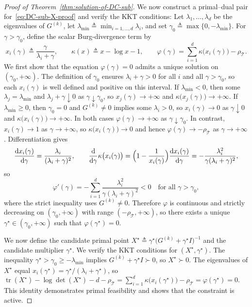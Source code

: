\documentclass[11pt, letterpaper, oneside, reqno]{amsart}
\DeclareMathOperator{\Tr}{tr}
\newcommand{\opt}{^\star}
\newcommand{\Let}{\triangleq}
\newcommand{\dd}{\mathrm{d}}
\begin{document}
\begin{proof}[Proof of Theorem~\ref{thm:solution-of-DC-sub}]
We now construct a primal--dual pair for~\eqref{eq:DC-sub-X-proof} and verify the KKT conditions:
Let $\lambda_1,\dots,\lambda_d$ be the eigenvalues of $G^{(k)}$, let $\lambda_{\min} \Let \min_{i=1,\dots,d}\lambda_i$, and set $\gamma_0 \Let \max\{0,-\lambda_{\min}\}$. For $\gamma>\gamma_0$, define the scalar Burg-divergence term by
\[
x_i(\gamma) \Let \frac{\gamma}{\lambda_i+\gamma},
\qquad
\kappa(x) \Let x-\log x-1,
\qquad
\varphi(\gamma) = \sum_{i=1}^d \kappa\bigl(x_i(\gamma)\bigr) - \rho_{\mathcal T}.
\]
We first show that the equation $\varphi(\gamma)=0$ admits a unique solution on $(\gamma_0,+\infty)$. The definition of $\gamma_0$ ensures $\lambda_i+\gamma>0$ for all $i$ and all $\gamma>\gamma_0$, so each $x_i(\gamma)$ is well defined and positive on this interval. If $\lambda_{\min}<0$, then some $\lambda_j=\lambda_{\min}$ and $\lambda_j+\gamma \downarrow 0$ as $\gamma \downarrow \gamma_0$, so $x_j(\gamma) \to +\infty$ and $\kappa\bigl(x_j(\gamma)\bigr)\to +\infty$. If $\lambda_{\min}\ge 0$, then $\gamma_0=0$ and $G^{(k)}\neq 0$ implies some $\lambda_i>0$, so $x_i(\gamma)\to 0$ as $\gamma\downarrow 0$ and $\kappa\bigl(x_i(\gamma)\bigr)\to +\infty$. In both cases $\varphi(\gamma)\to +\infty$ as $\gamma \downarrow \gamma_0$. In contrast, $x_i(\gamma)\to 1$ as $\gamma\to+\infty$, so $\kappa\bigl(x_i(\gamma)\bigr)\to 0$ and hence $\varphi(\gamma)\to -\rho_{\mathcal T}$ as $\gamma\to+\infty$. Differentiation gives
\[
\frac{\dd x_i(\gamma)}{\dd \gamma} = \frac{\lambda_i}{(\lambda_i+\gamma)^2},
\qquad
\frac{\dd}{\dd \gamma}\kappa\bigl(x_i(\gamma)\bigr)
= \Bigl(1-\frac{1}{x_i(\gamma)}\Bigr)\frac{\dd x_i(\gamma)}{\dd \gamma}
= -\frac{\lambda_i^2}{\gamma(\lambda_i+\gamma)^2},
\]
so
\[
\varphi'(\gamma)
= -\sum_{i=1}^d \frac{\lambda_i^2}{\gamma(\lambda_i+\gamma)^2}
<0
\quad \text{for all }\gamma>\gamma_0,
\]
where the strict inequality uses $G^{(k)}\neq 0$. Therefore $\varphi$ is continuous and strictly decreasing on $(\gamma_0,+\infty)$ with range $(-\rho_{\mathcal T},+\infty)$, so there exists a unique $\gamma\opt \in (\gamma_0,+\infty)$ such that $\varphi(\gamma\opt)=0$.

We now define the candidate primal point $X\opt \Let \gamma\opt\bigl(G^{(k)}+\gamma\opt I\bigr)^{-1}$ 
and the candidate multiplier $\gamma\opt$. We verify the KKT conditions for $(X\opt,\gamma\opt)$.
The inequality $\gamma\opt>\gamma_0 \ge -\lambda_{\min}$ implies $G^{(k)}+\gamma\opt I \succ 0$, so $X\opt \succ 0$. The eigenvalues of $X\opt$ equal $x_i(\gamma\opt)=\gamma\opt/(\lambda_i+\gamma\opt)$, so
$\Tr(X\opt) - \log\det(X\opt) - d - \rho_{\mathcal T}
= \sum_{i=1}^d \kappa\bigl(x_i(\gamma\opt)\bigr) - \rho_{\mathcal T}
= \varphi(\gamma\opt)
= 0$.
This identity demonstrates primal feasibility and shows that the constraint is active.


\end{proof}
\end{document}
